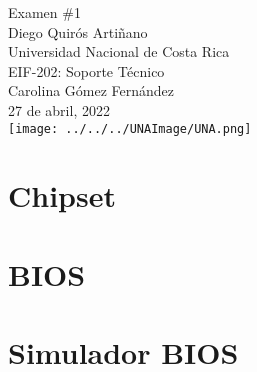 \documentclass[stu, 12pt, letterpaper, donotrepeattitle, floatsintext, natbib, helv]{apa7}
\begin{document}
\begin{titlepage}
    \centering
    \vfill
    \LARGE Examen \#1\\
    \vskip2cm
    \large Diego Quirós Artiñano \\
    Universidad Nacional de Costa Rica \\
    EIF-202: Soporte Técnico \\ 
    Carolina Gómez Fernández \\
    27 de abril, 2022 \\
    \vfill
    \texttt{[image: ../../../UNAImage/UNA.png]} \\
    \vfill
    \vfill
\end{titlepage}

\addto{}
\tableofcontents
\setcounter{tocdepth}{2}
\newpage
\renewcommand{\listfigurename}{\largeÍndice de fíguras}
\listoffigures
\newpage
\renewcommand{\listtablename}{\largeÍndice de tablas}
\listoftables
\newpage




\section*{Chipset}
{}



\section*{BIOS}
{}



\section*{Simulador BIOS}
{}
\end{document}
